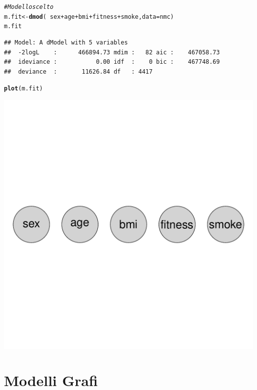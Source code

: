 \documentclass{article}\usepackage[]{graphicx}\usepackage[]{xcolor}
\makeatletter
\def\maxwidth{ %
  \ifdim\Gin@nat@width>\linewidth
    \linewidth
  \else
    \Gin@nat@width
  \fi
}
\newcommand{\hlcom}[1]{\textcolor[rgb]{0.678,0.584,0.686}{\textit{#1}}}%
\newcommand{\hlopt}[1]{\textcolor[rgb]{0,0,0}{#1}}%
\newcommand{\hlstd}[1]{\textcolor[rgb]{0.345,0.345,0.345}{#1}}%
\newcommand{\hlkwb}[1]{\textcolor[rgb]{0.69,0.353,0.396}{#1}}%
\newcommand{\hlkwc}[1]{\textcolor[rgb]{0.333,0.667,0.333}{#1}}%
\newcommand{\hlkwd}[1]{\textcolor[rgb]{0.737,0.353,0.396}{\textbf{#1}}}%
\newenvironment{kframe}{%
 \def\at@end@of@kframe{}%
 \ifinner\ifhmode%
  \def\at@end@of@kframe{\end{minipage}}%
  \begin{minipage}{\columnwidth}%
 \fi\fi%
 \def\FrameCommand##1{\hskip\@totalleftmargin \hskip-\fboxsep
 \colorbox{shadecolor}{##1}\hskip-\fboxsep
     \hskip-\linewidth \hskip-\@totalleftmargin \hskip\columnwidth}%
 \MakeFramed {\advance\hsize-\width
   \@totalleftmargin\z@ \linewidth\hsize
   \@setminipage}}%
 {\par\unskip\endMakeFramed%
 \at@end@of@kframe}
\newenvironment{knitrout}{}{} %
\makeatother
\begin{document}
\begin{knitrout}
\color{fgcolor}\begin{kframe}
\begin{alltt}
\hlcom{#Modello scelto}
\hlstd{m.fit} \hlkwb{<-} \hlkwd{dmod}\hlstd{(}\hlopt{~}\hlstd{sex}\hlopt{+}\hlstd{age}\hlopt{+}\hlstd{bmi}\hlopt{+}\hlstd{fitness}\hlopt{+}\hlstd{smoke,} \hlkwc{data}\hlstd{=nmc)}
\hlstd{m.fit}
\end{alltt}
\begin{verbatim}
## Model: A dModel with 5 variables
##  -2logL    :      466894.73 mdim :   82 aic :    467058.73 
##  ideviance :           0.00 idf  :    0 bic :    467748.69 
##  deviance  :       11626.84 df   : 4417
\end{verbatim}
\begin{alltt}
\hlkwd{plot}\hlstd{(m.fit)}
\end{alltt}
\end{kframe}
\includegraphics[width=\maxwidth]{figure/VisualizzazioneGrafoModello-1} 
\end{knitrout}

\clearpage


\clearpage

\section{Modelli Grafi}
\end{document}
